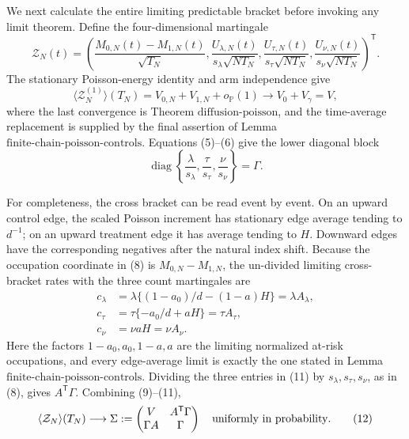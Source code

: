 We next calculate the entire limiting predictable bracket before invoking any limit theorem.  Define the four-dimensional martingale
\[
 \mathcal Z_N(t)=\left(
 \frac{M_{0,N}(t)-M_{1,N}(t)}{\sqrt{T_N}},
 \frac{U_{\lambda,N}(t)}{s_\lambda\sqrt{NT_N}},
 \frac{U_{\tau,N}(t)}{s_\tau\sqrt{NT_N}},
 \frac{U_{\nu,N}(t)}{s_\nu\sqrt{NT_N}}
 \right)^{\mathsf T}.                                           \tag{8}
\]
The stationary Poisson-energy identity and arm independence give
\[
 \langle\mathcal Z_N^{(1)}\rangle(T_N)
 =V_{0,N}+V_{1,N}+o_{\mathbb P}(1)
 \longrightarrow V_0+V_\gamma=V,                               \tag{9}
\]
where the last convergence is Theorem \(\mathrm{diffusion\mbox{-}poisson}\), and the time-average replacement is supplied by the final assertion of Lemma \(\mathrm{finite\mbox{-}chain\mbox{-}poisson\mbox{-}controls}\).  Equations (5)--(6) give the lower diagonal block
\[
 \operatorname{diag}\left\{\frac{\lambda}{s_\lambda},
 \frac{\tau}{s_\tau},\frac{\nu}{s_\nu}\right\}=\Gamma.       \tag{10}
\]

For completeness, the cross bracket can be read event by event.  On an upward control edge, the scaled Poisson increment has stationary edge average tending to \(d^{-1}\); on an upward treatment edge it has average tending to \(H\).  Downward edges have the corresponding negatives after the natural index shift.  Because the occupation coordinate in (8) is \(M_{0,N}-M_{1,N}\), the un-divided limiting cross-bracket rates with the three count martingales are
\[
 \begin{split}
 c_\lambda
 &=\lambda\{(1-a_0)/d-(1-a)H\}=\lambda A_\lambda,\\
 c_\tau
 &=\tau\{-a_0/d+aH\}=\tau A_\tau,\\
 c_\nu
 &=\nu aH=\nu A_\nu.
 \end{split}                                                     \tag{11}
\]
Here the factors \(1-a_0,a_0,1-a,a\) are the limiting normalized at-risk occupations, and every edge-average limit is exactly the one stated in Lemma \(\mathrm{finite\mbox{-}chain\mbox{-}poisson\mbox{-}controls}\).  Dividing the three entries in (11) by \(s_\lambda,s_\tau,s_\nu\), as in (8), gives \(A^{\mathsf T}\Gamma\).  Combining (9)--(11),
\[
 \langle\mathcal Z_N\rangle(T_N)
 \longrightarrow
 \Sigma:=\begin{pmatrix}V&A^{\mathsf T}\Gamma\\
                          \Gamma A&\Gamma\end{pmatrix}
 \quad\hbox{uniformly in probability}.                          \tag{12}
\]

